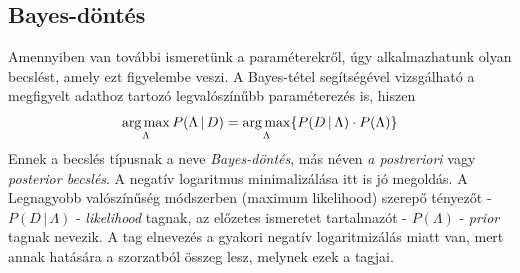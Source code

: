 \subsection{Bayes-döntés}
Amennyiben van további ismeretünk a paraméterekről, úgy alkalmazhatunk olyan becslést, amely ezt figyelembe veszi. A Bayes-tétel segítségével vizsgálható a megfigyelt adathoz tartozó legvalószínűbb paraméterezés is, hiszen
$$\operatorname*{arg\,max}_{\Lambda}{P(\Lambda\,|\,D)} = \operatorname*{arg\,max}_{\Lambda}\{P(D\,|\,\Lambda) \cdot P(\Lambda)\}$$
Ennek a becslés típusnak a neve \emph{Bayes-döntés}, más néven \emph{a postreriori} vagy \emph{posterior becslés}. A negatív logaritmus minimalizálása itt is jó megoldás. A Legnagyobb valószínűség módszerben (maximum likelihood) szerepő tényezőt - $P(D\,|\,\Lambda)$ - \emph{likelihood} tagnak, az előzetes ismeretet tartalmazót - $P(\Lambda)$ - \emph{prior} tagnak nevezik. A tag elnevezés a gyakori negatív logaritmizálás miatt van, mert annak hatására a szorzatból összeg lesz, melynek ezek a tagjai.


